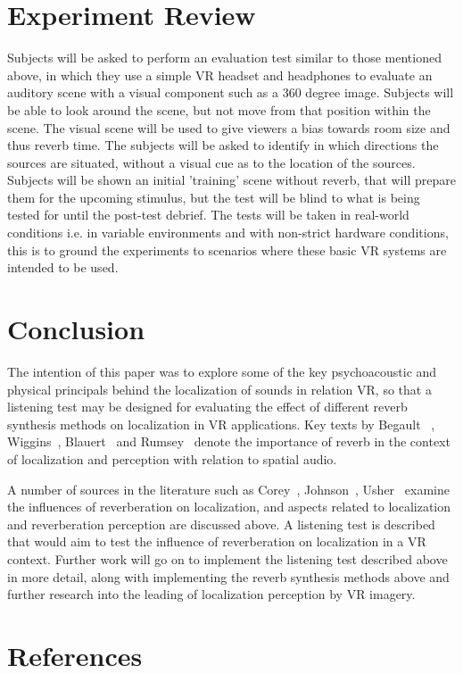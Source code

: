 \documentclass[paper=a4, fontsize=10pt, font=arial]{scrartcl} %
\numberwithin{equation}{section} %
\numberwithin{figure}{section} %
\numberwithin{table}{section} %
\begin{document}
\section{Experiment Review}
Subjects will be asked to perform an evaluation test similar to those mentioned above, in which they use a simple VR headset and headphones to evaluate an auditory scene with a visual component such as a 360 degree image. Subjects will be able to look around the scene, but not move from that position within the scene. The visual scene will be used to give viewers a bias towards room size and thus reverb time. The subjects will be asked to identify in which directions the sources are situated, without a visual cue as to the location of the sources. 
Subjects will be shown an initial 'training' scene without reverb, that will prepare them for the upcoming stimulus, but the test will be blind to what is being tested for until the post-test debrief. The tests will be taken in real-world conditions i.e. in variable environments and with non-strict hardware conditions, this is to ground the experiments to scenarios where these basic VR systems are intended to be used.

\section{Conclusion}
The intention of this paper was to explore some of the key psychoacoustic and physical principals behind the localization of sounds in relation VR, so that a listening test may be designed for evaluating the effect of different reverb synthesis methods on localization in VR applications. Key texts by Begault~\cite{Begault1995} , Wiggins~\cite{Wiggins2004}, Blauert~\cite{Blauert1997} and Rumsey~\cite{rumsey2012spatial} denote the importance of reverb in the context of localization and perception with relation to spatial audio.

A number of sources in the literature such as Corey~\cite{Corey2002}, Johnson~\cite{Johnson2016}, Usher~\cite{Usher2005} examine the influences of reverberation on localization, and aspects related to localization and reverberation perception are discussed above. A listening test is described that would aim to test the influence of reverberation on localization in a VR context.
Further work will go on to implement the listening test described above in more detail, along with implementing the reverb synthesis methods above and further research into the leading of localization perception by VR imagery.

\newpage
\section{References}

{}

\end{document}

